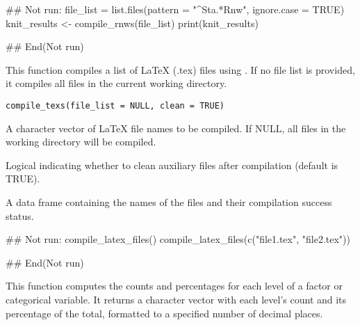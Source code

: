 \documentclass[a4paper]{book}
\begin{document}
\begin{Examples}
\begin{ExampleCode}
## Not run: 
  file_list = list.files(pattern = "^Sta.*Rnw", ignore.case = TRUE)
  knit_results <- compile_rnws(file_list)
  print(knit_results)

## End(Not run)

\end{ExampleCode}
\end{Examples}
%
\begin{Description}
This function compiles a list of LaTeX (.tex) files using .
If no file list is provided, it compiles all  files in the current working directory.
\end{Description}
%
\begin{Usage}
\begin{verbatim}
compile_texs(file_list = NULL, clean = TRUE)
\end{verbatim}
\end{Usage}
%
\begin{Arguments}
\begin{ldescription}
\item[\code{file\_list}] A character vector of LaTeX file names to be compiled. If NULL, all  files in the working directory will be compiled.

\item[\code{clean}] Logical indicating whether to clean auxiliary files after compilation (default is TRUE).
\end{ldescription}
\end{Arguments}
%
\begin{Value}
A data frame containing the names of the files and their compilation success status.
\end{Value}
%
\begin{Examples}
\begin{ExampleCode}
## Not run: 
  compile_latex_files()
  compile_latex_files(c("file1.tex", "file2.tex"))

## End(Not run)

\end{ExampleCode}
\end{Examples}
%
\begin{Description}
This function computes the counts and percentages for each level of a factor or categorical variable.
It returns a character vector with each level's count and its percentage of the total, formatted to a specified number of decimal places.
\end{Description}
\end{document}
